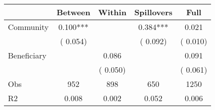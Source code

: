 
\begin{tabular}{l*{4}{c}}\hline&\multicolumn{1}{c}{Between}&\multicolumn{1}{c}{Within}&\multicolumn{1}{c}{Spillovers}&\multicolumn{1}{c}{Full}\\ \hline
 Community             &              0.100***      &                                               &        0.384*** &         0.021                            \\ 
                               &        (       0.054)           &                                       &       (       0.092)     &      (       0.010)                                           \\ 
 Beneficiary   &                                               &        0.086    &                                &             0.091                            \\ 
                               &                                               & (       0.050)                  &                                        &      (       0.061)                                           \\ 
\hline                                                                                                                                                                                                                                            
 Obs                   &               952               &       898                       &       650                &              1250                                               \\ 
 R2                    &                      0.008              &              0.002                      &              0.052               &                     0.006                                              \\ 
\hline \end{tabular}                                                                                                                                                                                                              